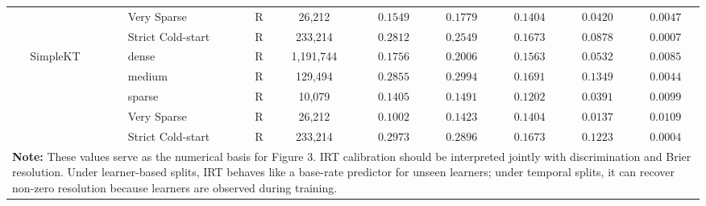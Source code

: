 \begin{table}[htbp]
{\begin{tabular}{lllrcccccc}
 &  & Very Sparse & R & 26,212 & $0.1549$ & $0.1779$ & $0.1404$ & $0.0420$ & $0.0047$ \\
 &  & Strict Cold-start & R & 233,214 & $0.2812$ & $0.2549$ & $0.1673$ & $0.0878$ & $0.0007$ \\
 & SimpleKT & dense & R & 1,191,744 & $0.1756$ & $0.2006$ & $0.1563$ & $0.0532$ & $0.0085$ \\
 &  & medium & R & 129,494 & $0.2855$ & $0.2994$ & $0.1691$ & $0.1349$ & $0.0044$ \\
 &  & sparse & R & 10,079 & $0.1405$ & $0.1491$ & $0.1202$ & $0.0391$ & $0.0099$ \\
 &  & Very Sparse & R & 26,212 & $0.1002$ & $0.1423$ & $0.1404$ & $0.0137$ & $0.0109$ \\
 &  & Strict Cold-start & R & 233,214 & $0.2973$ & $0.2896$ & $0.1673$ & $0.1223$ & $0.0004$ \\
\bottomrule
\multicolumn{10}{p{17.5cm}}{\scriptsize \textbf{Note:} These values serve as the numerical basis for Figure 3. IRT calibration should be interpreted jointly with discrimination and Brier resolution. Under learner-based splits, IRT behaves like a base-rate predictor for unseen learners; under temporal splits, it can recover non-zero resolution because learners are observed during training.} \\
\end{tabular}%
}
\end{table}
